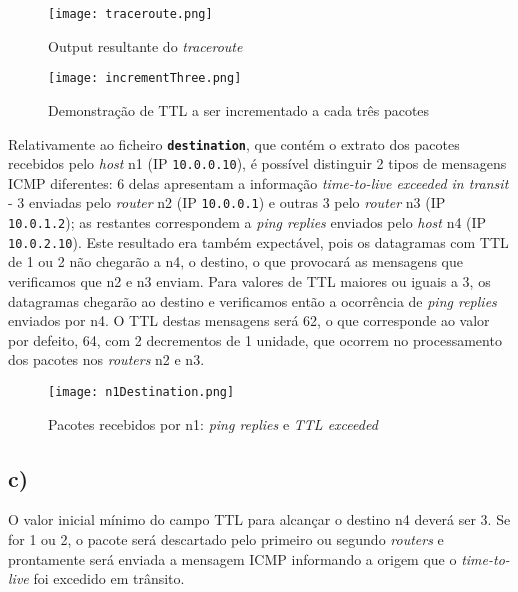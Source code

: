 \documentclass{llncs}
\begin{document}
\begin{figure}[!hb]
	\begin{center}
		\texttt{[image: traceroute.png]}
		\caption{Output resultante do \textit{traceroute}}
	\end{center}
\end{figure}

\begin{figure}
    \begin{center}
        \texttt{[image: incrementThree.png]}
        \caption{Demonstração de TTL a ser incrementado a cada três pacotes}
    \end{center}
\end{figure}

Relativamente ao ficheiro \textbf{\texttt{destination}}, que contém o extrato dos pacotes recebidos pelo \textit{host} n1 (IP \texttt{10.0.0.10}), é possível distinguir 2 tipos de mensagens ICMP diferentes: 6 delas apresentam a informação \textit{time-to-live exceeded in transit} - 3 enviadas pelo \textit{router} n2 (IP \texttt{10.0.0.1}) e outras 3 pelo \textit{router} n3 (IP \texttt{10.0.1.2}); as restantes correspondem a \textit{ping replies} enviados pelo \textit{host} n4 (IP \texttt{10.0.2.10}). Este resultado era também expectável, pois os datagramas com TTL de 1 ou 2 não chegarão a n4, o destino, o que provocará as mensagens que verificamos que n2 e n3 enviam. Para valores de TTL maiores ou iguais a 3, os datagramas chegarão ao destino e verificamos então a ocorrência de \textit{ping replies} enviados por n4. O TTL destas mensagens será 62, o que corresponde ao valor por defeito, 64, com 2 decrementos de 1 unidade, que ocorrem no processamento dos pacotes nos \textit{routers} n2 e n3.

\begin{figure}
    \begin{center}
        \texttt{[image: n1Destination.png]}
        \caption{Pacotes recebidos por n1: \textit{ping replies} e \textit{TTL exceeded}}
    \end{center}
\end{figure}

\subsection*{c)}

O valor inicial mínimo do campo TTL para alcançar o destino n4 deverá ser 3. Se for 1 ou 2, o pacote será descartado pelo primeiro ou segundo \textit{routers} e prontamente será enviada a mensagem ICMP informando a origem que o \textit{time-to-live} foi excedido em trânsito. 
\end{document}
